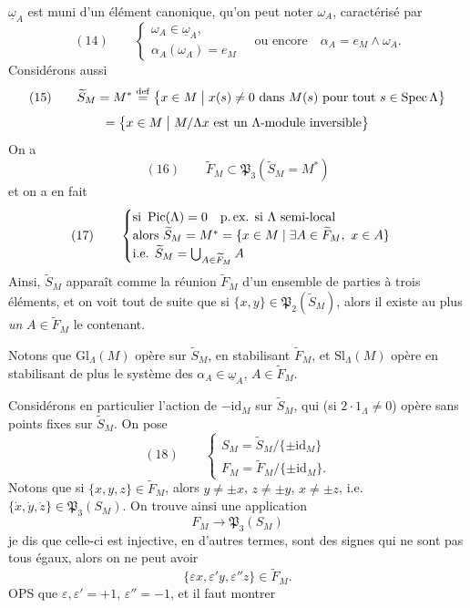\documentclass[11pt,a4paper]{article}
\begin{document}
$\underline{\omega}_A$ est muni d'un élément canonique, qu'on peut noter $\omega_A$, caractérisé par
\[
(14)\qquad \begin{cases} \omega_A \in \underline{\omega}_A, \\ \alpha_A(\omega_A) = e_M \end{cases} \quad \text{ou encore} \quad \alpha_A = e_M \wedge \omega_A .
\]
Considérons aussi
\[
(15)\qquad \widetilde{S}_M = M^* \overset{\mathrm{def}}{=} \bigl\{ x \in M \bigm| x(s) \neq 0 \text{ dans } M(s) \text{ pour tout } s \in \operatorname{Spec}\Lambda \bigr\}
\]
\[
= \bigl\{ x \in M \bigm| M/\Lambda x \text{ est un } \Lambda\text{-module inversible} \bigr\}
\]
On a  
\[
(16)\qquad \widetilde{F}_M \subset \mathfrak{P}_3(\widetilde{S}_M = M^*)
\]
et on a en fait
\[
(17)\qquad \begin{cases} \text{si } \operatorname{Pic}(\Lambda) = 0 \quad \text{p.\,ex. si } \Lambda \text{ semi-local} \\ \text{alors } \widetilde{S}_M = M^* = \{ x \in M \mid \exists A \in \widetilde{F}_M,\ x \in A \} \\ \text{i.e. } \widetilde{S}_M = \bigcup_{A \in \widetilde{F}_M} A \end{cases}
\]
Ainsi, $\widetilde{S}_M$ apparaît comme la réunion $\widetilde{F}_M$ d'un ensemble de parties à trois éléments, et on voit tout de suite que si $\{x,y\} \in \mathfrak{P}_2(\widetilde{S}_M)$, alors il existe au plus \emph{un} $A \in \widetilde{F}_M$ le contenant.

Notons que $\mathrm{Gl}_\Lambda(M)$ opère sur $\widetilde{S}_M$, en stabilisant $\widetilde{F}_M$, et $\mathrm{Sl}_\Lambda(M)$ opère en stabilisant de plus le système des $\alpha_A \in \underline{\omega}_A$, $A \in \widetilde{F}_M$.

 Considérons en particulier l'action de  $-\mathrm{id}_M$ sur $\widetilde{S}_M$, qui (si $2 \cdot 1_\Lambda \neq 0$) opère sans points fixes sur $\widetilde{S}_M$. On pose
\[
(18)\qquad \begin{cases} S_M = \widetilde{S}_M/\{\pm \mathrm{id}_M\} \\ F_M = \widetilde{F}_M/\{\pm \mathrm{id}_M\} . \end{cases}
\]
Notons que si $\{x,y,z\} \in \widetilde{F}_M$, alors $y \neq \pm x$, $z \neq \pm y$, $x \neq \pm z$, i.e. $\{\dot{x}, \dot{y}, \dot{z}\} \in \mathfrak{P}_3(S_M)$. On trouve ainsi une application
\[
F_M \longrightarrow \mathfrak{P}_3(S_M)
\]
je dis que celle-ci est injective, en d'autres termes,    sont des signes qui ne sont pas tous égaux, alors on ne peut avoir
\[
\{\varepsilon x, \varepsilon' y, \varepsilon'' z\} \in \widetilde{F}_M .
\]
OPS que $\varepsilon, \varepsilon' = +1$, $\varepsilon'' = -1$, et il faut montrer
\end{document}
